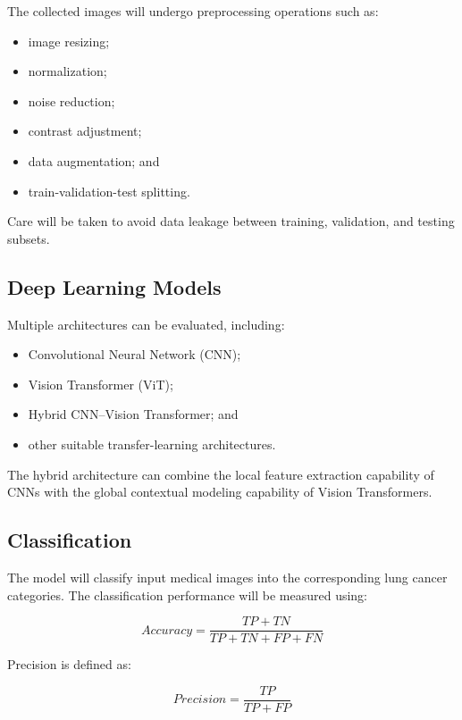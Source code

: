 \documentclass[12pt,a4paper]{article}
\begin{document}
The collected images will undergo preprocessing operations such as:

\begin{itemize}
    \item image resizing;
    \item normalization;
    \item noise reduction;
    \item contrast adjustment;
    \item data augmentation; and
    \item train-validation-test splitting.
\end{itemize}

Care will be taken to avoid data leakage between training, validation, and testing subsets.

\subsection{Deep Learning Models}

Multiple architectures can be evaluated, including:

\begin{itemize}
    \item Convolutional Neural Network (CNN);
    \item Vision Transformer (ViT);
    \item Hybrid CNN--Vision Transformer; and
    \item other suitable transfer-learning architectures.
\end{itemize}

The hybrid architecture can combine the local feature extraction capability of CNNs with the global contextual modeling capability of Vision Transformers.

\subsection{Classification}

The model will classify input medical images into the corresponding lung cancer categories. The classification performance will be measured using:

\begin{equation}
Accuracy = \frac{TP + TN}{TP + TN + FP + FN}
\end{equation}

Precision is defined as:

\begin{equation}
Precision = \frac{TP}{TP + FP}
\end{equation}
\end{document}
